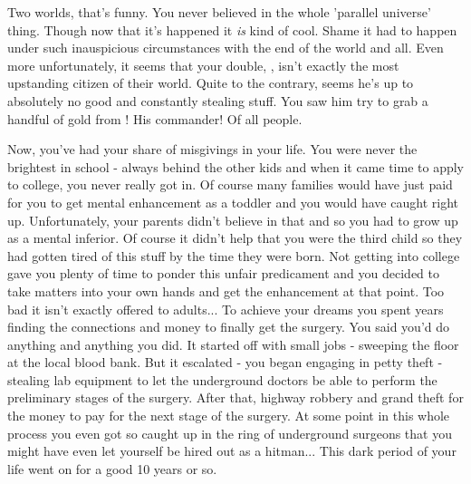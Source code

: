 \documentclass[char]{guildcamp3}
\begin{document}
\name{\cSpecOpOne{}}



Two worlds, that's funny. You never believed in the whole 'parallel universe' thing. Though now that it's happened it \emph{is} kind of cool. Shame it had to happen under such inauspicious circumstances with the end of the world and all. Even more unfortunately, it seems that your double, \cRogueTwo{\intro}, isn't exactly the most upstanding citizen of their world. Quite to the contrary, seems he's up to absolutely no good and constantly stealing stuff. You saw him try to grab a handful of gold from \cNobleTwo{\intro}! His commander! Of all people. 

Now, you've had your share of misgivings in your life. You were never the brightest in school - always behind the other kids and when it came time to apply to college, you never really got in. Of course many families would have just paid for you to get mental enhancement as a toddler and you would have caught right up. Unfortunately, your parents didn't believe in that and so you had to grow up as a mental inferior. Of course it didn't help that you were the third child so they had gotten tired of this stuff by the time they were born. Not getting into college gave you plenty of time to ponder this unfair predicament and you decided to take matters into your own hands and get the enhancement at that point. Too bad it isn't exactly offered to adults... To achieve your dreams you spent years finding the connections and money to finally get the surgery. You said you'd do anything and anything you did. It started off with small jobs - sweeping the floor at the local blood bank. But it escalated - you began engaging in petty theft - stealing lab equipment to let the underground doctors be able to perform the preliminary stages of the surgery. After that, highway robbery and grand theft for the money to pay for the next stage of the surgery. At some point in this whole process you even got so caught up in the ring of underground surgeons that you might have even let yourself be hired out as a hitman... This dark period of your life went on for a good 10 years or so.
\end{document}
